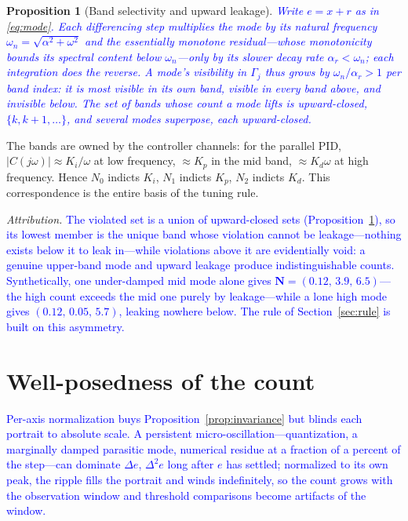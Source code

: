 \documentclass[final,3p,times,twocolumn]{elsarticle}
\newcommand{\rev}[1]{\textcolor{blue}{#1}}  %
\newcommand{\revb}[1]{\textcolor{blue}{#1}} %
\newcommand{\revd}[1]{\textcolor{blue}{#1}} %
\newcommand{\reve}[1]{\textcolor{blue}{#1}} %
\newtheorem{proposition}{Proposition}
\begin{document}
\begin{proposition}[Band selectivity and upward leakage]\label{prop:band}
\revd{Write $e = x + r$ as in \eqref{eq:mode}. Each differencing
step multiplies the mode by its natural frequency
$\omega_n=\sqrt{\alpha^2+\omega^2}$ and the essentially monotone
residual---whose monotonicity bounds its spectral content below
$\omega_n$---only by its slower decay rate
\reve{$\alpha_r<\omega_n$}; each
integration does the reverse. A mode's visibility in $\Gamma_j$ thus
grows by $\omega_n/\alpha_r>1$ per band index: it is most visible in
its own band, visible in every band above, and invisible below. The
set of bands whose count a mode lifts is upward-closed,
$\{k,k{+}1,\dots\}$, and several modes superpose, each
upward-closed.}
\end{proposition}

The bands are owned by the controller channels: for the parallel PID,
$|C(j\omega)| \approx K_i/\omega$ at low frequency, $\approx K_p$ in the
mid band, $\approx K_d\omega$ at high frequency. Hence $N_0$ indicts
$K_i$, $N_1$ indicts $K_p$, $N_2$ indicts $K_d$. This correspondence is
the entire basis of the tuning rule.

\emph{Attribution.} \revb{The violated set is a union of
upward-closed sets (Proposition~\ref{prop:band}), so its lowest member
is the unique band whose violation cannot be leakage---nothing exists
below it to leak in---while violations above it are evidentially void:
a genuine upper-band mode and upward leakage produce indistinguishable
counts. Synthetically, one under-damped mid mode alone gives
$\mathbf N = (0.12,\, 3.9,\, 6.5)$---the high count exceeds the mid
one purely by leakage---while a lone high mode gives
$(0.12,\, 0.05,\, 5.7)$, leaking nowhere below. The rule of
Section~\ref{sec:rule} is built on this asymmetry.}

\section{Well-posedness of the count}
\label{sec:wellposed}

\rev{Per-axis normalization buys Proposition~\ref{prop:invariance} but
blinds each portrait to absolute scale. A persistent
micro-oscillation---quantization, a marginally damped parasitic mode,
numerical residue at a fraction of a percent of the step---can dominate
$\Delta e$, $\Delta^2 e$ long after $e$ has settled; normalized to its
own peak, the ripple fills the portrait and winds indefinitely, so the
count grows with the observation window and threshold comparisons become
artifacts of the window.}
\end{document}
